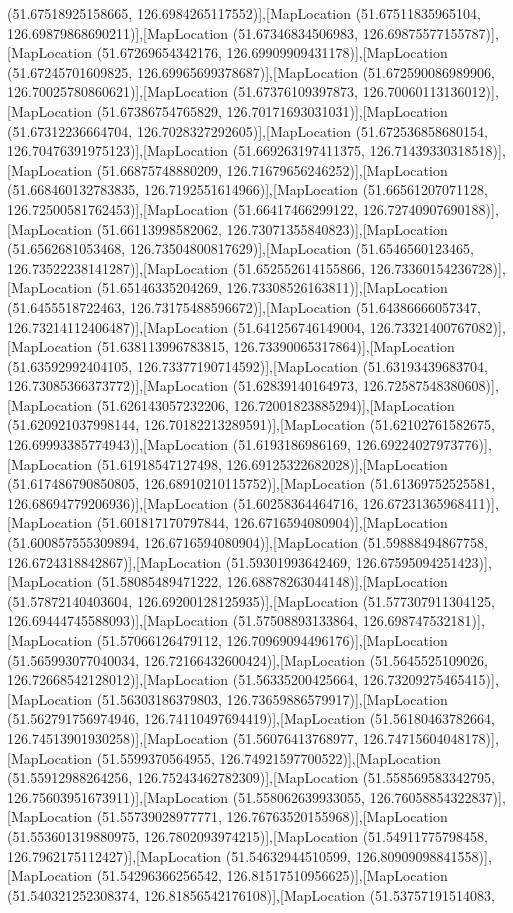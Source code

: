 (51.67518925158665, 126.6984265117552)],[MapLocation (51.67511835965104, 126.69879868690211)],[MapLocation (51.67346834506983, 126.69875577155787)],[MapLocation (51.67269654342176, 126.69909909431178)],[MapLocation (51.67245701609825, 126.69965699378687)],[MapLocation (51.672590086989906, 126.70025780860621)],[MapLocation (51.67376109397873, 126.70060113136012)],[MapLocation (51.67386754765829, 126.70171693031031)],[MapLocation (51.67312236664704, 126.7028327292605)],[MapLocation (51.672536858680154, 126.70476391975123)],[MapLocation (51.669263197411375, 126.71439330318518)],[MapLocation (51.66875748880209, 126.71679656246252)],[MapLocation (51.668460132783835, 126.7192551614966)],[MapLocation (51.66561207071128, 126.72500581762453)],[MapLocation (51.66417466299122, 126.72740907690188)],[MapLocation (51.66113998582062, 126.73071355840823)],[MapLocation (51.6562681053468, 126.73504800817629)],[MapLocation (51.6546560123465, 126.73522238141287)],[MapLocation (51.652552614155866, 126.73360154236728)],[MapLocation (51.65146335204269, 126.73308526163811)],[MapLocation (51.6455518722463, 126.73175488596672)],[MapLocation (51.64386666057347, 126.73214112406487)],[MapLocation (51.641256746149004, 126.73321400767082)],[MapLocation (51.638113996783815, 126.73390065317864)],[MapLocation (51.63592992404105, 126.73377190714592)],[MapLocation (51.63193439683704, 126.73085366373772)],[MapLocation (51.62839140164973, 126.72587548380608)],[MapLocation (51.626143057232206, 126.72001823885294)],[MapLocation (51.620921037998144, 126.70182213289591)],[MapLocation (51.62102761582675, 126.69993385774943)],[MapLocation (51.6193186986169, 126.69224027973776)],[MapLocation (51.61918547127498, 126.69125322682028)],[MapLocation (51.617486790850805, 126.68910210115752)],[MapLocation (51.61369752525581, 126.68694779206936)],[MapLocation (51.60258364464716, 126.67231365968411)],[MapLocation (51.601817170797844, 126.6716594080904)],[MapLocation (51.600857555309894, 126.6716594080904)],[MapLocation (51.59888494867758, 126.6724318842867)],[MapLocation (51.59301993642469, 126.67595094251423)],[MapLocation (51.58085489471222, 126.68878263044148)],[MapLocation (51.57872140403604, 126.69200128125935)],[MapLocation (51.577307911304125, 126.69444745588093)],[MapLocation (51.57508893133864, 126.698747532181)],[MapLocation (51.57066126479112, 126.70969094496176)],[MapLocation (51.565993077040034, 126.72166432600424)],[MapLocation (51.5645525109026, 126.72668542128012)],[MapLocation (51.56335200425664, 126.73209275465415)],[MapLocation (51.56303186379803, 126.73659886579917)],[MapLocation (51.562791756974946, 126.74110497694419)],[MapLocation (51.56180463782664, 126.74513901930258)],[MapLocation (51.56076413768977, 126.74715604048178)],[MapLocation (51.5599370564955, 126.74921597700522)],[MapLocation (51.55912988264256, 126.75243462782309)],[MapLocation (51.558569583342795, 126.75603951673911)],[MapLocation (51.558062639933055, 126.76058854322837)],[MapLocation (51.55739028977771, 126.76763520155968)],[MapLocation (51.553601319880975, 126.7802093974215)],[MapLocation (51.54911775798458, 126.7962175112427)],[MapLocation (51.54632944510599, 126.80909098841558)],[MapLocation (51.54296366256542, 126.81517510956625)],[MapLocation (51.540321252308374, 126.81856542176108)],[MapLocation (51.53757191514083, 